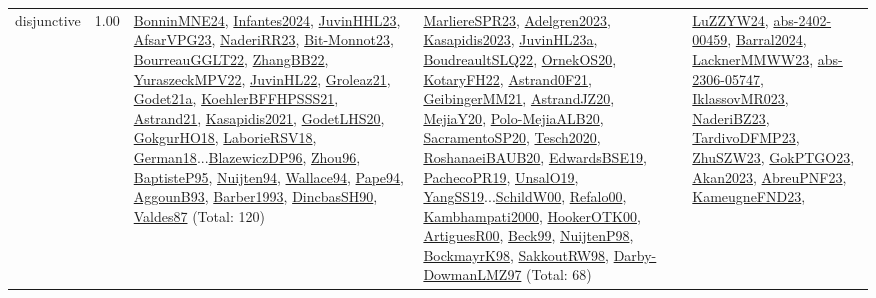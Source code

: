 {\begin{longtable}{p{3cm}r>{\raggedright\arraybackslash}p{6cm}>{\raggedright\arraybackslash}p{6cm}>{\raggedright\arraybackslash}p{8cm}}
\index{disjunctive}\index{Constraints!disjunctive}disjunctive &  1.00 & \hyperref[detail:BonninMNE24]{BonninMNE24}, \hyperref[detail:Infantes2024]{Infantes2024}, \hyperref[detail:JuvinHHL23]{JuvinHHL23}, \hyperref[detail:AfsarVPG23]{AfsarVPG23}, \hyperref[detail:NaderiRR23]{NaderiRR23}, \hyperref[detail:Bit-Monnot23]{Bit-Monnot23}, \hyperref[detail:BourreauGGLT22]{BourreauGGLT22}, \hyperref[detail:ZhangBB22]{ZhangBB22}, \hyperref[detail:YuraszeckMPV22]{YuraszeckMPV22}, \hyperref[detail:JuvinHL22]{JuvinHL22}, \hyperref[detail:Groleaz21]{Groleaz21}, \hyperref[detail:Godet21a]{Godet21a}, \hyperref[detail:KoehlerBFFHPSSS21]{KoehlerBFFHPSSS21}, \hyperref[detail:Astrand21]{Astrand21}, \hyperref[detail:Kasapidis2021]{Kasapidis2021}, \hyperref[detail:GodetLHS20]{GodetLHS20}, \hyperref[detail:GokgurHO18]{GokgurHO18}, \hyperref[detail:LaborieRSV18]{LaborieRSV18}, \hyperref[detail:German18]{German18}...\hyperref[detail:BlazewiczDP96]{BlazewiczDP96}, \hyperref[detail:Zhou96]{Zhou96}, \hyperref[detail:BaptisteP95]{BaptisteP95}, \hyperref[detail:Nuijten94]{Nuijten94}, \hyperref[detail:Wallace94]{Wallace94}, \hyperref[detail:Pape94]{Pape94}, \hyperref[detail:AggounB93]{AggounB93}, \hyperref[detail:Barber1993]{Barber1993}, \hyperref[detail:DincbasSH90]{DincbasSH90}, \hyperref[detail:Valdes87]{Valdes87} (Total: 120) & \hyperref[detail:MarliereSPR23]{MarliereSPR23}, \hyperref[detail:Adelgren2023]{Adelgren2023}, \hyperref[detail:Kasapidis2023]{Kasapidis2023}, \hyperref[detail:JuvinHL23a]{JuvinHL23a}, \hyperref[detail:BoudreaultSLQ22]{BoudreaultSLQ22}, \hyperref[detail:OrnekOS20]{OrnekOS20}, \hyperref[detail:KotaryFH22]{KotaryFH22}, \hyperref[detail:Astrand0F21]{Astrand0F21}, \hyperref[detail:GeibingerMM21]{GeibingerMM21}, \hyperref[detail:AstrandJZ20]{AstrandJZ20}, \hyperref[detail:MejiaY20]{MejiaY20}, \hyperref[detail:Polo-MejiaALB20]{Polo-MejiaALB20}, \hyperref[detail:SacramentoSP20]{SacramentoSP20}, \hyperref[detail:Tesch2020]{Tesch2020}, \hyperref[detail:RoshanaeiBAUB20]{RoshanaeiBAUB20}, \hyperref[detail:EdwardsBSE19]{EdwardsBSE19}, \hyperref[detail:PachecoPR19]{PachecoPR19}, \hyperref[detail:UnsalO19]{UnsalO19}, \hyperref[detail:YangSS19]{YangSS19}...\hyperref[detail:SchildW00]{SchildW00}, \hyperref[detail:Refalo00]{Refalo00}, \hyperref[detail:Kambhampati2000]{Kambhampati2000}, \hyperref[detail:HookerOTK00]{HookerOTK00}, \hyperref[detail:ArtiguesR00]{ArtiguesR00}, \hyperref[detail:Beck99]{Beck99}, \hyperref[detail:NuijtenP98]{NuijtenP98}, \hyperref[detail:BockmayrK98]{BockmayrK98}, \hyperref[detail:SakkoutRW98]{SakkoutRW98}, \hyperref[detail:Darby-DowmanLMZ97]{Darby-DowmanLMZ97} (Total: 68) & \hyperref[detail:LuZZYW24]{LuZZYW24}, \hyperref[detail:abs-2402-00459]{abs-2402-00459}, \hyperref[detail:Barral2024]{Barral2024}, \hyperref[detail:LacknerMMWW23]{LacknerMMWW23}, \hyperref[detail:abs-2306-05747]{abs-2306-05747}, \hyperref[detail:IklassovMR023]{IklassovMR023}, \hyperref[detail:NaderiBZ23]{NaderiBZ23}, \hyperref[detail:TardivoDFMP23]{TardivoDFMP23}, \hyperref[detail:ZhuSZW23]{ZhuSZW23}, \hyperref[detail:GokPTGO23]{GokPTGO23}, \hyperref[detail:Akan2023]{Akan2023}, \hyperref[detail:AbreuPNF23]{AbreuPNF23}, \hyperref[detail:KameugneFND23]{KameugneFND23}, 
\end{longtable}}
